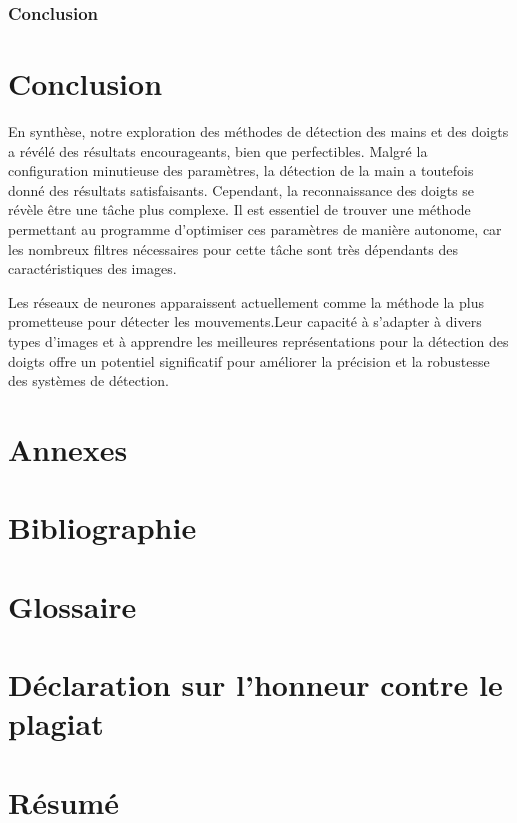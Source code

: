 \documentclass[11pt]{article}
\begin{document}
\subsubsection{Conclusion}

\section*{Conclusion}
En synthèse, notre exploration des méthodes de détection des mains et des doigts a révélé des résultats encourageants, bien que perfectibles. Malgré la configuration minutieuse des paramètres, la détection de la main a toutefois donné des résultats satisfaisants. Cependant, la reconnaissance des doigts se révèle être une tâche plus complexe. Il est essentiel de trouver une méthode permettant au programme d'optimiser ces paramètres de manière autonome, car les nombreux filtres nécessaires pour cette tâche sont très dépendants des caractéristiques des images. \bigbreak

Les réseaux de neurones apparaissent actuellement comme la méthode la plus prometteuse pour détecter les mouvements.Leur capacité à s'adapter à divers types d'images et à apprendre les meilleures représentations pour la détection des doigts offre un potentiel significatif pour améliorer la précision et la robustesse des systèmes de détection. \bigbreak

\newpage

\section*{Annexes}

\section*{Bibliographie}
\newpage

\section*{Glossaire}

\section*{Déclaration sur l'honneur contre le plagiat}

\newpage

\newpage
\section*{Résumé}
\end{document}
